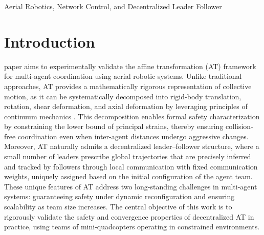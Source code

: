\documentclass[journal]{IEEEtran}
\theoremstyle{definition}
\theoremstyle{plain}
\begin{document}
\begin{IEEEkeywords}
Aerial Robotics, Network Control, and Decentralized Leader Follower
\end{IEEEkeywords}






%
\IEEEpeerreviewmaketitle



\section{Introduction}

 paper aims to experimentally validate the affine transformation (AT) framework for multi-agent coordination using aerial robotic systems. Unlike traditional approaches, AT provides a mathematically rigorous representation of collective motion, as it can be systematically decomposed into rigid-body translation, rotation, shear deformation, and axial deformation by leveraging principles of continuum mechanics \cite{rastgoftar2022integration, rastgoftar2021scalable}. This decomposition enables formal safety characterization by constraining the lower bound of principal strains, thereby ensuring collision-free coordination even when inter-agent distances undergo aggressive changes. Moreover, AT naturally admits a decentralized leader–follower structure, where a small number of leaders prescribe global trajectories that are precisely inferred and tracked by followers through local communication with fixed communication weights, uniquely assigned based on the initial configuration of the agent team.  These unique features of AT address two long-standing challenges in multi-agent systems: guaranteeing safety under dynamic reconfiguration and ensuring scalability as team size increases. The central objective of this work is to rigorously validate the safety and convergence properties of decentralized AT in practice, using teams of mini-quadcopters operating in constrained environments.
\end{document}
